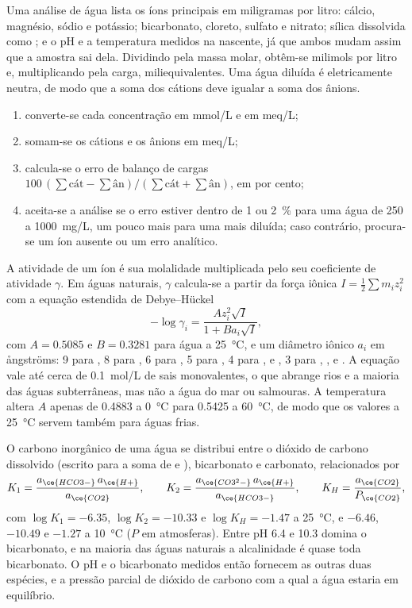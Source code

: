 Uma análise de água lista os íons principais em miligramas por litro: cálcio,
magnésio, sódio e potássio; bicarbonato, cloreto, sulfato e nitrato;
sílica dissolvida como ; e o pH e a temperatura medidos na
nascente, já que ambos mudam assim que a amostra sai dela. Dividindo pela massa
molar, obtêm-se milimols por litro e, multiplicando pela carga,
miliequivalentes. Uma água diluída é eletricamente neutra, de modo que a soma dos
cátions deve igualar a soma dos ânions.

\begin{method}\label{met:b3:water-rock-interaction:analysis}
\begin{enumerate}
\item converte-se cada concentração em \unit{mmol/L} e em \unit{meq/L};
\item somam-se os cátions e os ânions em \unit{meq/L};
\item calcula-se o erro de balanço de cargas $100\,(\sum\text{cát} -
  \sum\text{ân})/(\sum\text{cát} + \sum\text{ân})$, em por cento;
\item aceita-se a análise se o erro estiver dentro de 1 ou \qty{2}{\percent} para uma
  água de 250 a \qty{1000}{mg/L}, um pouco mais para uma mais diluída;
  caso contrário, procura-se um íon ausente ou um erro analítico.
\end{enumerate}
\end{method}

A atividade de um íon é sua molalidade multiplicada pelo seu coeficiente de
atividade $\gamma$. Em águas naturais, $\gamma$ calcula-se a partir da força iônica $I =
\tfrac12\sum m_i z_i^2$ com a equação estendida de Debye--Hückel
\[
-\log\gamma_i = \frac{A z_i^2\sqrt I}{1 + B a_i\sqrt I},
\]
com $A = 0.5085$ e $B = 0.3281$ para água a \qty{25}{\celsius}, e um
diâmetro iônico $a_i$ em ångströms: 9 para , 8 para , 6 para
, 5 para , 4 para ,  e ,
3 para , ,  e . A equação vale até
cerca de \qty{0.1}{mol/L} de sais monovalentes, o que abrange rios e a maioria das
águas subterrâneas, mas não a água do mar ou salmouras. A temperatura altera $A$ apenas de
0.4883 a \qty{0}{\celsius} para 0.5425 a \qty{60}{\celsius}, de modo que os valores a
\qty{25}{\celsius} servem também para águas frias.

O carbono inorgânico de uma água se distribui entre o dióxido de carbono dissolvido
(escrito  para a soma de  e ), bicarbonato e
carbonato, relacionados por
\[
K_1 = \frac{a_{\ce{HCO3-}}\,a_{\ce{H+}}}{a_{\ce{CO2}}}, \qquad
K_2 = \frac{a_{\ce{CO3^2-}}\,a_{\ce{H+}}}{a_{\ce{HCO3-}}}, \qquad
K_H = \frac{a_{\ce{CO2}}}{P_{\ce{CO2}}},
\]
com $\log K_1 = -6.35$, $\log K_2 = -10.33$ e $\log K_H = -1.47$ a
\qty{25}{\celsius}, e $-6.46$, $-10.49$ e $-1.27$ a \qty{10}{\celsius}
($P$ em atmosferas). Entre pH 6.4 e 10.3 domina o bicarbonato, e na
maioria das águas naturais a alcalinidade é quase toda bicarbonato. O pH
e o bicarbonato medidos então fornecem as outras duas espécies, e a pressão parcial de
dióxido de carbono com a qual a água estaria em equilíbrio.

